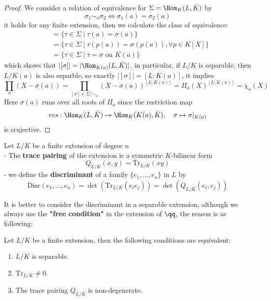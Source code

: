 \begin{proof}
  We consider a relation of equivalence for \(\Sigma = \Hom_{K}(L,\bar{K})\) by
  \[\sigma_1 \sim_a \sigma_2 \iff \sigma_1(a) = \sigma_2(a)\]
  it holds for any finite extension, then we calculate the class of equivalence:
  \begin{align*}
    [\sigma] &= \{\tau \in \Sigma \mid \tau(a) = \sigma(a)\} \\
    &= \{\tau \in \Sigma \mid \tau(p(a)) = \sigma(p(a)) , \forall p \in K[X]\}\\
    &= \{\tau \in \Sigma \mid \tau = \sigma \text{ on } K(a)\}
  \end{align*}
  which shows that \( |[\sigma]| = |\Hom_{K(a)}(L,\bar{K})|\), in particular, if \(L/K\) is separable, then \(L/K(a)\) is also separble, so exactly \(|[\sigma]| = [L:K(a)]\), it implies
  \[\prod_{\sigma}(X-\sigma(a)) = \prod_{[\sigma] \in \Sigma/\sim_a} (X-\sigma(a))^{[L:K(a)]} = \Pi_a(X)^{[L:K(a)]} = \chi_a(X)\]
  Here \(\sigma(a)\) runs over all roots of \(\Pi_a\) since the restriction map
\[res: \Hom_K(L,\bar{K}) \to \Hom_K(K(a),\bar{K}), \quad \sigma \mapsto \sigma|_{K(a)}\]
is srujective.

\end{proof}

\begin{definition}
  Let \(L/K\) be a finite extension of degree \(n\)\\
  - The \textbf{trace pairing} of the extension is a symmetric \(K\)-bilinear form
  \[Q_{L/K}(x,y) =  \mathrm{Tr}_{L/K}(xy)\]
  - we define the \textbf{discriminant} of a family \(\{e_1,\dots,e_n\}\) in \(L\)  by
\[\mathrm{Disc}(e_1,...,e_n) = \det(\mathrm{Tr}_{L/K}(e_ie_j)) = \det(Q_{L/K}(e_i,e_j)) \]
\end{definition}

It is better to consider the discriminant in a separable extension, although we always use the \textbf{"free condition"} in the extension of \(\qq\), the reason is as following:

\begin{proposition}
  Let \(L/K\) be a finite extension, then the following conditions are equivalent:
  \begin{enumerate}
    \item \(L/K\) is separable.
    \item \(\mathrm{Tr}_{L/K} \neq 0\).
    \item The trace pairing \(Q_{L/K}\) is non-degenerate.
  \end{enumerate}

\end{proposition}

